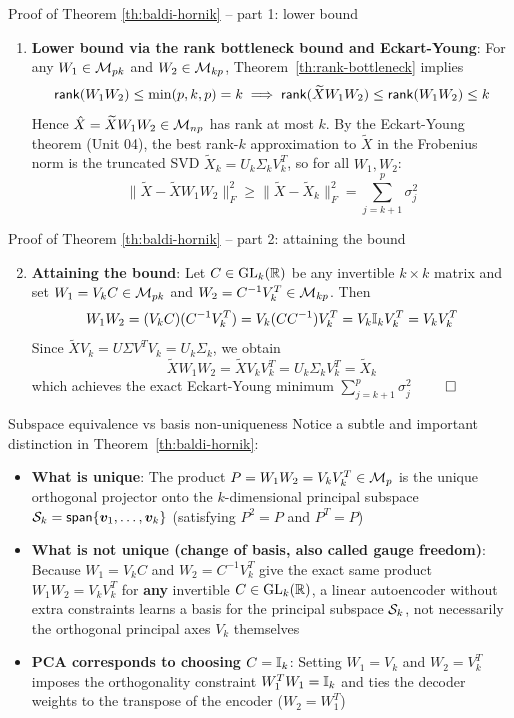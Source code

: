 \documentclass[aspectratio=169]{beamer}\usepackage[]{graphicx}\usepackage[]{xcolor}
\begin{document}
\begin{frame}[importantcolour]{Proof of Theorem \ref{th:baldi-hornik} -- part 1: lower bound}
\begin{enumerate}
\item \textbf{Lower bound via the rank bottleneck bound and Eckart-Young}:
For any $W_1 \in \M_{pk}$ and $W_2 \in \M_{kp}$, Theorem~\ref{th:rank-bottleneck} implies
\[
\rank(W_1 W_2) \le \min(p, k, p) = k \implies \rank(\widetilde{X} W_1 W_2) \le \rank(W_1 W_2) \le k
\]
\vfill
Hence $\hat{X} = \widetilde{X} W_1 W_2 \in \M_{np}$ has rank at most $k$.
By the Eckart-Young theorem (Unit 04), the best rank-$k$ approximation to $\widetilde{X}$ in the Frobenius norm is the truncated SVD $\widetilde{X}_k = U_k \Sigma_k V_k^T$, so for all $W_1, W_2$:
\[
\|\widetilde{X} - \widetilde{X} W_1 W_2\|_F^2 \ge \|\widetilde{X} - \widetilde{X}_k\|_F^2 = \sum_{j=k+1}^p \sigma_j^2
\]
\end{enumerate}
\end{frame}


\begin{frame}[importantcolour]{Proof of Theorem \ref{th:baldi-hornik} -- part 2: attaining the bound}
\begin{enumerate}
\setcounter{enumi}{1}
\item \textbf{Attaining the bound}:
Let $C \in \GL_k(\IR)$ be any invertible $k \times k$ matrix and set $W_1 = V_k C \in \M_{pk}$ and $W_2 = C^{-1} V_k^T \in \M_{kp}$.
Then
\[
W_1 W_2 = (V_k C)(C^{-1} V_k^T) = V_k (C C^{-1}) V_k^T = V_k \II_k V_k^T = V_k V_k^T
\]
\vfill
Since $\widetilde{X} V_k = U \Sigma V^T V_k = U_k \Sigma_k$, we obtain
\[
\widetilde{X} W_1 W_2 = \widetilde{X} V_k V_k^T = U_k \Sigma_k V_k^T = \widetilde{X}_k
\]
which achieves the exact Eckart-Young minimum $\sum_{j=k+1}^p \sigma_j^2$ \hfill $\qed$
\end{enumerate}
\end{frame}


\begin{frame}{Subspace equivalence vs basis non-uniqueness}
Notice a subtle and important distinction in Theorem~\ref{th:baldi-hornik}:
\vfill
\begin{itemize}
\item \textbf{What is unique}: The product $P = W_1 W_2 = V_k V_k^T \in \M_p$ is the unique orthogonal projector onto the $k$-dimensional principal subspace $\S_k = \Span\{\bv_1, \ldots, \bv_k\}$ (satisfying $P^2 = P$ and $P^T = P$)
\vfill
\item \textbf{What is not unique (change of basis, also called gauge freedom)}: Because $W_1 = V_k C$ and $W_2 = C^{-1} V_k^T$ give the exact same product $W_1 W_2 = V_k V_k^T$ for \textbf{any} invertible $C \in \GL_k(\IR)$, a linear autoencoder without extra constraints learns a basis for the principal subspace $\S_k$, not necessarily the orthogonal principal axes $V_k$ themselves
\vfill
\item \textbf{PCA corresponds to choosing $C = \II_k$}: Setting $W_1 = V_k$ and $W_2 = V_k^T$ imposes the orthogonality constraint $W_1^T W_1 = \II_k$ and ties the decoder weights to the transpose of the encoder ($W_2 = W_1^T$)
\end{itemize}
\end{frame}
\end{document}
